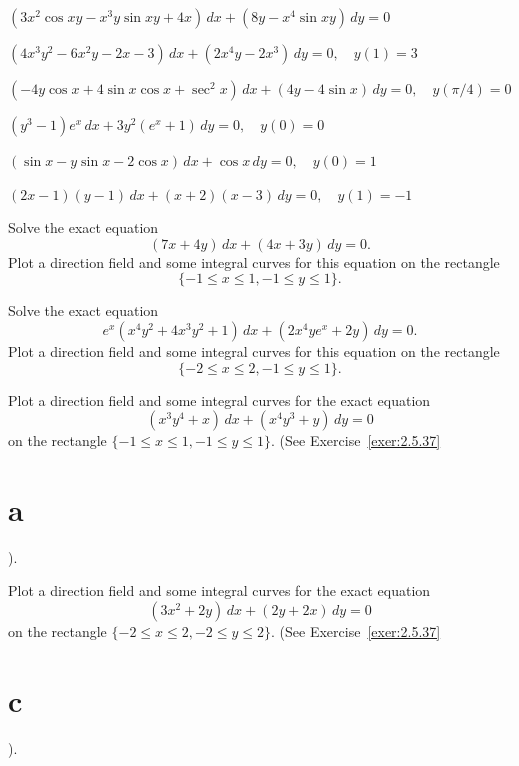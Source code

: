 \begin{exerciselist}
  \item\label{exer:2.5.17} $(3x^{2}\cos xy-x^{3}y\sin xy+4x)\,dx+(8y-x^{4}\sin xy)\,dy=0$


  \item\label{exer:2.5.18} $(4x^{3}y^{2}-6x^{2}y-2x-3)\,dx+(2x^{4}y-2x^{3})\,dy=0,\quad y(1)=3$

  \item\label{exer:2.5.19}
        $(-4y\cos x+4\sin x\cos x+\sec^{2}x)\,dx+ (4y-4\sin x)\,dy=0,\quad y(\pi/4)=0$

  \item\label{exer:2.5.20} $(y^{3}-1)e^{x}\,dx+3y^{2}(e^{x}+1)\,dy=0,\quad y(0)=0$

  \item\label{exer:2.5.21} $(\sin x-y\sin x-2\cos x)\,dx+\cos x\,dy=0,\quad y(0)=1$

  \item\label{exer:2.5.22} $(2x-1)(y-1)\,dx+(x+2)(x-3)\,dy=0,\quad y(1)=-1$

  \item\label{exer:2.5.23} \CGex Solve the exact equation
  \[
    (7x+4y)\,dx+(4x+3y)\,dy=0.
  \]
  Plot a direction field and some integral curves for this equation on the rectangle
  \[
    \{-1\le x\le1,-1\le y\le1\}.
  \]

  \item\label{exer:2.5.24} \CGex Solve the exact equation
  \[
    e^{x}(x^{4}y^{2}+4x^{3}y^{2}+1)\,dx+(2x^{4}ye^{x}+2y)\,dy=0.
  \]
  Plot a direction field and some integral curves for this equation on the rectangle
  \[
    \{-2\le x\le2,-1\le y\le1\}.
  \]

  \item\label{exer:2.5.25} \CGex Plot a direction field and some integral curves for the exact
        equation
  \[
    (x^{3}y^{4}+x)\,dx+(x^{4}y^{3}+y)\,dy=0
  \]
  on the rectangle $\{-1\le x\le1,-1\le y\le1\}$. (See Exercise~\ref{exer:2.5.37}\part{a}).

  \item\label{exer:2.5.26} \CGex Plot a direction field and some integral curves for the exact
        equation
  \[
    (3x^{2}+2y)\,dx+(2y+2x)\,dy=0
  \]
  on the rectangle $\{-2\le x\le2,-2\le y\le2\}$. (See Exercise~\ref{exer:2.5.37}\part{c}).


\end{exerciselist}
